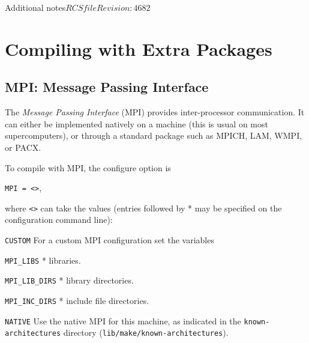 \begin{cactuspart}{Additional notes}{$RCSfile$}{$Revision: 4682 $}
\begin{itemize}
\end{itemize}




\section{Compiling with Extra Packages}
\label{subsec:cowiexpa}


\subsection{MPI: Message Passing Interface}
\label{subsubsec:Compiling-MPI}

The \textit{Message Passing Interface} (MPI) provides inter-processor
communication. It can either be implemented natively on a machine
(this is usual on most supercomputers), or through a standard package
such as MPICH, LAM, WMPI, or PACX.

To compile with MPI, the configure option is

\texttt{MPI = <>},

where \texttt{<>} can take the values (entries followed by *
may be specified on the configuration command line):

\begin{Lentry}

\item[\texttt{CUSTOM}] For a custom MPI configuration set the variables
  \begin{Lentry}
  \item [\texttt{MPI\_LIBS}] * libraries.
  \item [\texttt{MPI\_LIB\_DIRS}] * library directories.
  \item [\texttt{MPI\_INC\_DIRS}] * include file directories.
  \end{Lentry}

\item[\texttt{NATIVE}] Use the native MPI for this machine, as indicated in
        the \texttt{known-architectures} directory
        (\texttt{lib/make/known-architectures}).


\end{Lentry}
\end{cactuspart}
